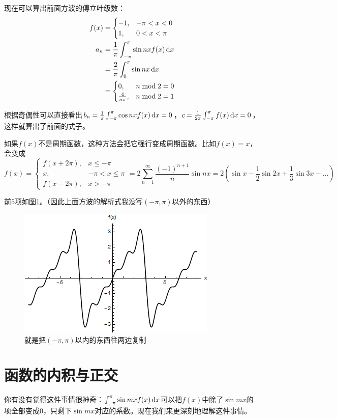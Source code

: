 现在可以算出前面方波的傅立叶级数：
\begin{align*}
f(x)&=\begin{cases} -1, &-\pi<x<0 \\ 1, &0<x<\pi \end{cases} \\
a_n&=\frac{1}{\pi} \int_{-\pi}^{\pi} \sin n x f(x) \mathop{}\!\mathrm{d} x \\
&=\frac{2}{\pi} \int_{0}^{\pi} \sin n x \mathop{}\!\mathrm{d} x \\
&=\begin{cases} 0, &n \bmod 2=0 \\ \frac{4}{n \pi}, &n \bmod 2=1 \end{cases}
\end{align*}

根据奇偶性可以直接看出$b_n=\frac{1}{\pi} \int_{-\pi}^{\pi} \cos n x f(x) \mathop{}\!\mathrm{d} x=0$，$c=\frac{1}{2 \pi} \int_{-\pi}^{\pi} f(x) \mathop{}\!\mathrm{d} x=0$，这样就算出了前面的式子。

如果$f(x)$不是周期函数，这种方法会把它强行变成周期函数。比如$f(x)=x$，会变成
\begin{equation*}
f(x)=\begin{cases} f(x+2 \pi), &x \le -\pi \\ x, &-\pi<x \le \pi \\ f(x-2 \pi), &x>-\pi \end{cases}=2 \sum_{n=1}^{\infty} \frac{(-1)^{n+1}}{n} \sin n x=2(\sin x-\frac{1}{2} \sin 2 x+\frac{1}{3} \sin 3 x-\dots)
\end{equation*}

前$5$项如图\ref{fig-trigo-x}。（因此上面方波的解析式我没写$(-\pi,\pi)$以外的东西）
\begin{figure}[htb]
\centering
\includegraphics[scale=0.5]{fig/trigo-x.png}
\caption{就是把$(-\pi,\pi)$以内的东西往两边复制}
\label{fig-trigo-x}
\end{figure}
\section{函数的内积与正交}
你有没有觉得这件事情很神奇：$\int_{-\pi}^{\pi} \sin m x f(x) \mathop{}\!\mathrm{d} x$可以把$f(x)$中除了$\sin m x$的项全部变成$0$，只剩下$\sin m x$对应的系数。现在我们来更深刻地理解这件事情。


